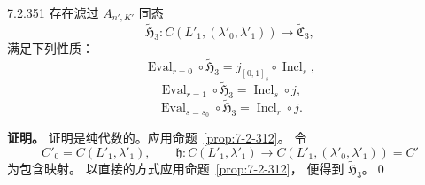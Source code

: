 \begin{lemma}{7.2.351}\label{lem:7-2-351}
存在滤过 $A_{n',K'}$ 同态
\[
\widetilde{\mathfrak H}_3\colon
C(L'_1,(\lambda'_0,\lambda'_1))
\longrightarrow\widetilde{\mathfrak C}_3,
\]
满足下列性质：
\begin{equation}
\operatorname{Eval}_{r=0}\circ
\widetilde{\mathfrak H}_3
=j_{[0,1]_s}\circ\operatorname{Incl}_s,
\tag{7.2.352.1}\label{eq:7-2-352-1}
\end{equation}
\begin{equation}
\operatorname{Eval}_{r=1}\circ
\widetilde{\mathfrak H}_3
=\operatorname{Incl}_s\circ j,
\tag{7.2.352.2}\label{eq:7-2-352-2}
\end{equation}
\begin{equation}
\operatorname{Eval}_{s=s_0}\circ
\widetilde{\mathfrak H}_3
=\operatorname{Incl}_r\circ j.
\tag{7.2.352.3}\label{eq:7-2-352-3}
\end{equation}
\end{lemma}

\noindent\textbf{证明。}
证明是纯代数的。应用命题~\ref{prop:7-2-312}。
令
\[
C'_0=C(L'_1,\lambda'_1),\qquad
\mathfrak h\colon C(L'_1,\lambda'_1)
\longrightarrow
C(L'_1,(\lambda'_0,\lambda'_1))=C'
\]
为包含映射。
以直接的方式应用命题~\ref{prop:7-2-312}，
便得到 $\widetilde{\mathfrak H}_3$。\qed
